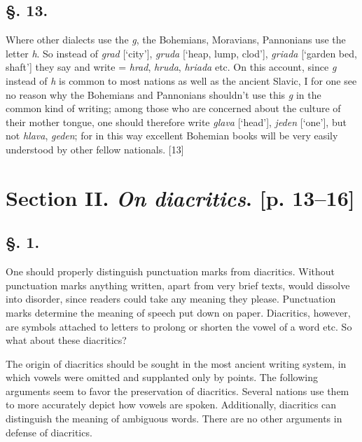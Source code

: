 \subsection*{\hspace*{\fill}§. 13.\hspace*{\fill}}

Where other dialects use the \textit{g}, the Bohemians, Moravians, Pannonians use the letter \textit{h}. So instead of \textit{grad} [‘city’], \textit{gruda} [‘heap, lump, clod’], \textit{griada} [‘garden bed, shaft’] they say and write = \textit{hrad}, \textit{hruda}, \textit{hriada} etc. On this account, since \textit{g} instead of \textit{h} is common to most nations as well as the ancient Slavic, I for one see no reason why the Bohemians and Pannonians shouldn’t use this \textit{g} in the common kind of writing; among those who are concerned about the culture of their mother tongue, one should therefore write \textit{glava} [‘head’], \textit{jeden} [‘one’], but not \textit{hlava}, \textit{geden}; for in this way excellent Bohemian books will be very easily understood by other fellow nationals. [13]

\section*{Section II. \textit{On diacritics}. [p. 13--16]}

\subsection*{\hspace*{\fill}§. 1.\hspace*{\fill}}

One should properly distinguish punctuation marks from diacritics. Without punctuation marks anything written, apart from very brief texts, would dissolve into disorder, since readers could take any meaning they please. Punctuation marks determine the meaning of speech put down on paper. Diacritics, however, are symbols attached to letters to prolong or shorten the vowel of a word etc. So what about these diacritics?

The origin of diacritics should be sought in the most ancient writing system, in which vowels were omitted and supplanted only by points. The following arguments seem to favor the preservation of diacritics. Several nations use them to more accurately depict how vowels are spoken. Additionally, diacritics can distinguish the meaning of ambiguous words. There are no other arguments in defense of diacritics.

